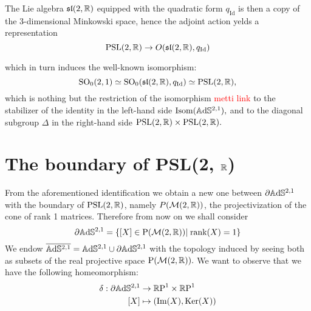 \begin{observation}
    The Lie algebra $\mathfrak{sl}(2,\mathbb{R})$ equipped with the quadratic form $q_{\text{Id}}$ is then a copy of the 3-dimensional Minkowski space, hence the adjoint action yelds a representation 
    \[
        \text{PSL}(2,\mathbb{R})\to O(\mathfrak{sl}(2,\mathbb{R}),q_{\text{Id}})
    \]

which in turn induces the well-known isomorphism: 
\[
    \text{SO}_0(2,1)\simeq\text{SO}_0(\mathfrak{sl}(2,\mathbb{R}), q_\text{Id})\simeq \text{PSL}(2,\mathbb{R}),
\] which is nothing but the restriction of the isomorphism \textcolor{red}{metti link} to the stabilizer of the identity in the left-hand side $\text{Isom}(\mathbb{A}\mathrm{d}\mathbb{S}^{2,1}),$ and to the diagonal subgroup $\Delta$ in the right-hand side $\text{PSL}(2,\mathbb{R})\times\text{PSL}(2,\mathbb{R}).$
\end{observation}

\section{The boundary of PSL(2, $\mathbb{R}$)} 
From the aforementioned identification we obtain a new one between $\partial\mathbb{A}\mathrm{d}\mathbb{S}^{2,1}$ with the boundary of $\text{PSL}(2,\mathbb{R})$, namely $P(\mathcal{M}(2,\mathbb{R}))$, the projectivization of the cone of rank 1 matrices. Therefore from now on we shall consider 
\[
    \partial\mathbb{A}\mathrm{d}\mathbb{S}^{2,1}=\{[X]\in\text{P}(\mathcal{M}(2,\mathbb{R}))|\;\text{rank}(X)=1\}
\]
We endow $\overline{\mathbb{A}\mathrm{d}\mathbb{S}^{2,1}}=\mathbb{A}\mathrm{d}\mathbb{S}^{2,1}\cup\partial\mathbb{A}\mathrm{d}\mathbb{S}^{2,1}$ with the topology induced by seeing both as subsets of the real projective space $\text{P}(\mathcal{M}(2,\mathbb{R})).$ We want to observe that we have the following homeomorphism: 
\begin{align*}\label{delta}
    \delta:\partial\mathbb{A}\mathrm{d}\mathbb{S}^{2,1}&\rightarrow\mathbb{R}\text{P}^1\times\mathbb{R}\text{P}^1\\
    [X]&\mapsto (\text{Im}(X),\text{Ker}(X))
\end{align*}


